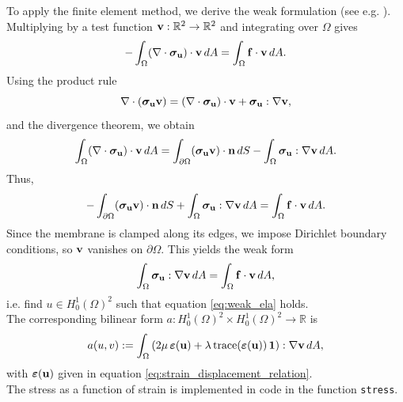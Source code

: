 To apply the finite element method, we derive the weak formulation (see e.g. \cite{Braess_2007}). Multiplying by a test function $\mathbf{v}:\mathbb{R}^2\to\mathbb{R}^2$ and integrating over $\Omega$ gives
\begin{equation*}
    -\int_\Omega (\nabla\cdot\boldsymbol{\sigma}_{\mathbf{u}})\cdot \mathbf{v} \, dA 
    = \int_\Omega \mathbf{f}\cdot \mathbf{v} \, dA.
\end{equation*}
Using the product rule
\[
\nabla\cdot(\boldsymbol{\sigma}_{\mathbf{u}} \mathbf{v}) = (\nabla\cdot\boldsymbol{\sigma}_{\mathbf{u}})\cdot \mathbf{v} + \boldsymbol{\sigma}_{\mathbf{u}} : \nabla \mathbf{v},
\]
and the divergence theorem, we obtain
\[
\int_\Omega (\nabla\cdot\boldsymbol{\sigma}_{\mathbf{u}})\cdot \mathbf{v} \, dA 
= \int_{\partial \Omega} (\boldsymbol{\sigma}_{\mathbf{u}} \mathbf{v})\cdot \mathbf{n}\, dS
- \int_\Omega \boldsymbol{\sigma}_{\mathbf{u}} : \nabla \mathbf{v} \, dA.
\]
Thus,
\begin{equation*}
    -\int_{\partial \Omega} (\boldsymbol{\sigma}_{\mathbf{u}} \mathbf{v})\cdot \mathbf{n}\, dS
    + \int_\Omega \boldsymbol{\sigma}_{\mathbf{u}} : \nabla \mathbf{v} \, dA
    = \int_\Omega \mathbf{f}\cdot \mathbf{v} \, dA.
\end{equation*}
Since the membrane is clamped along its edges, we impose Dirichlet boundary conditions, so $\mathbf{v}$ vanishes on $\partial \Omega$. This yields the weak form
\begin{equation}
    \int_\Omega \boldsymbol{\sigma}_{\mathbf{u}} : \nabla \mathbf{v} \, dA
    = \int_\Omega \mathbf{f}\cdot \mathbf{v} \, dA,
    \label{eq:weak_ela}
\end{equation}
i.e. find $u \in H^1_0(\Omega)^2$ such that equation \eqref{eq:weak_ela} holds.\\

The corresponding bilinear form $a:H^1_0(\Omega)^2\times H^1_0(\Omega)^2 \to \mathbb{R}$ is
\begin{equation}
    a(u,v) := \int_\Omega \left(2\mu\, \boldsymbol{\varepsilon}(\mathbf{u}) + \lambda\, \mathrm{trace}(\boldsymbol{\varepsilon}(\mathbf{u}))\, \mathbf{1}\right) : \nabla \mathbf{v} \, dA,
\end{equation}
with $\boldsymbol{\varepsilon}(\mathbf{u})$ given in equation \eqref{eq:strain_displacement_relation}.\\

The stress as a function of strain is implemented in code in the function \texttt{stress}.\\


